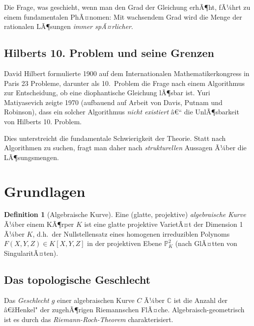 ﻿\documentclass[12pt,a4paper]{article}
\theoremstyle{plain}
\theoremstyle{definition}
\newtheorem{definition}[theorem]{Definition}
\theoremstyle{remark}
\newcommand{\C}{\mathbb{C}}
\begin{document}
Die Frage, was geschieht, wenn man den Grad der Gleichung erhÃ¶ht, fÃ¼hrt zu einem
fundamentalen PhÃ¤nomen: Mit wachsendem Grad wird die Menge der rationalen LÃ¶sungen
\emph{immer spÃ¤rlicher}.

\subsection{Hilberts 10. Problem und seine Grenzen}

David Hilbert formulierte 1900 auf dem Internationalen Mathematikerkongress in Paris 23
Probleme, darunter als 10.\ Problem die Frage nach einem Algorithmus zur Entscheidung,
ob eine diophantische Gleichung lÃ¶sbar ist. Yuri Matiyasevich zeigte 1970 (aufbauend
auf Arbeit von Davis, Putnam und Robinson), dass ein solcher Algorithmus \emph{nicht existiert} â€“
die UnlÃ¶sbarkeit von Hilberts 10. Problem.

Dies unterstreicht die fundamentale Schwierigkeit der Theorie. Statt nach Algorithmen
zu suchen, fragt man daher nach \emph{strukturellen} Aussagen Ã¼ber die LÃ¶sungsmengen.

\section{Grundlagen}

\begin{definition}[Algebraische Kurve]\label{def:kurve}
Eine (glatte, projektive) \emph{algebraische Kurve} Ã¼ber einem KÃ¶rper $K$ ist eine
glatte projektive VarietÃ¤t der Dimension 1 Ã¼ber $K$, d.h.\ der Nullstellensatz eines
homogenen irreduziblen Polynoms $F(X,Y,Z) \in K[X,Y,Z]$ in der projektiven Ebene $\mathbb{P}^2_K$
(nach GlÃ¤tten von SingularitÃ¤ten).
\end{definition}

\subsection{Das topologische Geschlecht}

Das \emph{Geschlecht} $g$ einer algebraischen Kurve $C$ Ã¼ber $\C$ ist die Anzahl
der â€žHenkel" der zugehÃ¶rigen Riemannschen FlÃ¤che. Algebraisch-geometrisch ist es
durch das \emph{Riemann-Roch-Theorem} charakterisiert.
\end{document}
